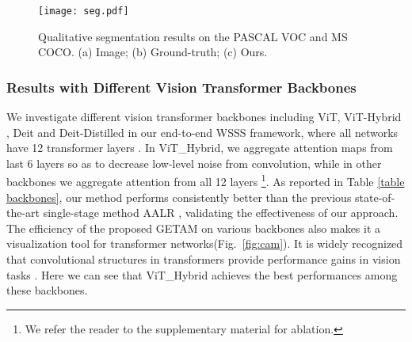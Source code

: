 \documentclass[10pt,twocolumn,letterpaper]{article}
\begin{document}
\begin{table}[]
\footnotesize
\centering {}
\caption{
Performances on different vision transformers. Our method performs consistently better.
}
\label{table backbones}
\end{table}





\begin{figure*}[tb!]
\begin{center}
   {\texttt{[image: seg.pdf]}} 
   \end{center}
\caption{Qualitative segmentation results on the PASCAL VOC and MS COCO. (a) Image; (b) Ground-truth; (c) Ours.
}
\label{fig:seg pred}
\end{figure*}






\subsubsection{Results with Different Vision Transformer Backbones}
We investigate different vision transformer backbones including ViT, ViT-Hybrid \cite{ranftl2021vision}, Deit and Deit-Distilled \cite{touvron2021training} in our end-to-end WSSS framework, where all networks have 12 transformer layers 
. In ViT\_Hybrid, we aggregate attention maps from last 6 layers so as to decrease low-level noise from convolution, while in other backbones we aggregate attention from all 12 layers \footnote{We refer the reader to the supplementary material for ablation.}. 
As reported in Table \ref{table backbones}, our method performs consistently better than the previous state-of-the-art single-stage method AALR \cite{zhang2021adaptive}, validating the effectiveness of our approach.
The efficiency of the proposed GETAM on various backbones also makes it a visualization tool for transformer networks(Fig.~\ref{fig:cam}).
It is widely recognized that convolutional structures in transformers provide performance gains in vision tasks \cite{dosovitskiy2020image,wu2021cvt,dai2021coatnet}. Here we can see that ViT\_Hybrid achieves the best performances among these backbones.
\end{document}

